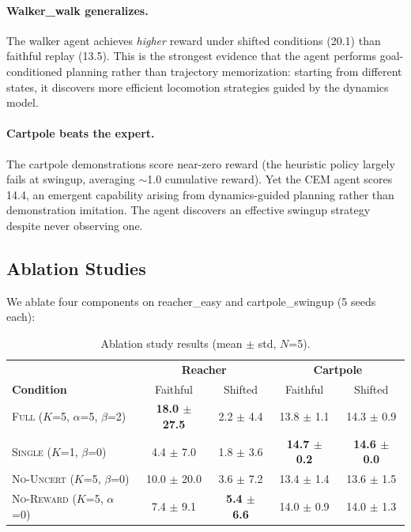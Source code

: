 \documentclass{article}
\begin{document}
\paragraph{Walker\_walk generalizes.}
The walker agent achieves \emph{higher} reward under shifted conditions (20.1) than faithful replay (13.5). This is the strongest evidence that the agent performs goal-conditioned planning rather than trajectory memorization: starting from different states, it discovers more efficient locomotion strategies guided by the dynamics model.

\paragraph{Cartpole beats the expert.}
The cartpole demonstrations score near-zero reward (the heuristic policy largely fails at swingup, averaging $\sim$1.0 cumulative reward). Yet the CEM agent scores 14.4, an emergent capability arising from dynamics-guided planning rather than demonstration imitation. The agent discovers an effective swingup strategy despite never observing one.

\subsection{Ablation Studies}

We ablate four components on reacher\_easy and cartpole\_swingup (5 seeds each):

\begin{table}[h]
\centering
\caption{Ablation study results (mean $\pm$ std, $N$=5).}
\label{tab:ablation}
\begin{tabular}{lcc|cc}
\toprule
& \multicolumn{2}{c|}{\textbf{Reacher}} & \multicolumn{2}{c}{\textbf{Cartpole}} \\
\textbf{Condition} & Faithful & Shifted & Faithful & Shifted \\
\midrule
\textsc{Full} ($K$=5, $\alpha$=5, $\beta$=2) & \textbf{18.0 $\pm$ 27.5} & 2.2 $\pm$ 4.4 & 13.8 $\pm$ 1.1 & 14.3 $\pm$ 0.9 \\
\textsc{Single} ($K$=1, $\beta$=0) & 4.4 $\pm$ 7.0 & 1.8 $\pm$ 3.6 & \textbf{14.7 $\pm$ 0.2} & \textbf{14.6 $\pm$ 0.0} \\
\textsc{No-Uncert} ($K$=5, $\beta$=0) & 10.0 $\pm$ 20.0 & 3.6 $\pm$ 7.2 & 13.4 $\pm$ 1.4 & 13.6 $\pm$ 1.5 \\
\textsc{No-Reward} ($K$=5, $\alpha$=0) & 7.4 $\pm$ 9.1 & \textbf{5.4 $\pm$ 6.6} & 14.0 $\pm$ 0.9 & 14.0 $\pm$ 1.3 \\
\bottomrule
\end{tabular}
\end{table}
\end{document}
